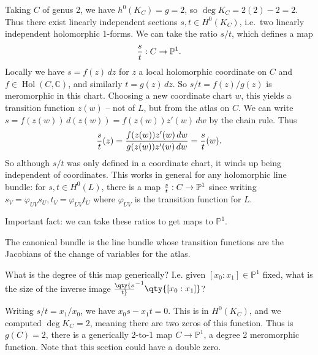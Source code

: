 \begin{example}

Taking \(C\) of genus 2, we have \(h^0(K_C) = g= 2\), so
\(\deg K_C = 2(2) - 2 = 2\). Thus there exist linearly independent
sections \(s, t \in H^0(K_C)\), i.e.~two linearly independent
holomorphic 1-forms. We can take the ratio \(s/t\), which defines a map
\begin{align*}
{s\over t}: C\to {\mathbb{P}}^1
.\end{align*}
Locally we have \(s = f(z) \,dz\) for \(z\) a local holomorphic
coordinate on \(C\) and \(f\in \mathop{\mathrm{Hol}}(C, {\mathbb{C}})\),
and similarly \(t = g(z) \,dz\). So \(s/t = f(z) / g(z)\) is meromorphic
in this chart. Choosing a new coordinate chart \(w\), this yields a
transition function \(z(w)\) -- not of \(L\), but from the atlas on
\(C\). We can write \(s =f(z(w)) \, d(z(w)) = f(z(w)) z'(w) \, dw\) by
the chain rule. Thus
\begin{align*}
{s\over t}(z) = {f(z(w)) z'(w) \,dw\over g(z(w)) z'(w) \,dw} = {s \over t}(w)
.\end{align*}
So although \(s/t\) was only defined in a coordinate chart, it winds up
being independent of coordinates. This works in general for any
holomorphic line bundle: for \(s, t\in H^0(L)\), there is a map
\({s\over t}: C\to {\mathbb{P}}^1\) since writing
\(s_V = \varphi_{UV} s_U, t_V = \varphi_{UV} t_U\) where
\(\varphi_{UV}\) is the transition function for \(L\).

\begin{fact}

Important fact: we can take these ratios to get maps to
\({\mathbb{P}}^1\).

\end{fact}

\begin{slogan}

The canonical bundle is the line bundle whose transition functions are
the Jacobians of the change of variables for the atlas.

\end{slogan}

\begin{question}

What is the degree of this map generically? I.e. given
\([x_0: x_1] \in {\mathbb{P}}^1\) fixed, what is the size of the inverse
image \(\qty{s\over t}^{-1}\qty{ [x_0: x_1] }\)?

\end{question}

\begin{answer}

Writing \(s/t = x_1/x_0\), we have \(x_0 s - x_1 t=0\). This is in
\(H^0(K_C)\), and we computed \(\deg K_C = 2\), meaning there are two
zeros of this function. Thus is \(g(C) = 2\), there is a generically
2-to-1 map \(C \to {\mathbb{P}}^1\), a degree 2 meromorphic function.
Note that this section could have a double zero.

\end{answer}

\end{example}

